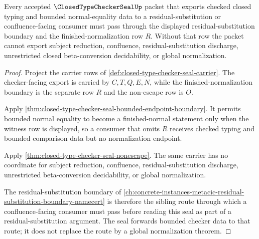 \begin{theorem}
\label{thm:closed-type-checker-seal-residual-substitution-forward-link}
Every accepted $\ClosedTypeCheckerSealUp$ packet that exports checked closed typing and bounded normal-equality data to a residual-substitution or confluence-facing consumer must pass through the displayed residual-substitution boundary and the finished-normalization row $R$. Without that row the packet cannot export subject reduction, confluence, residual-substitution discharge, unrestricted closed beta-conversion decidability, or global normalization.
\end{theorem}
\begin{proof}
Project the carrier rows of \autoref{def:closed-type-checker-seal-carrier}. The checker-facing export is carried by $C,T,Q,E,N$, while the finished-normalization boundary is the separate row $R$ and the non-escape row is $O$.

Apply \autoref{thm:closed-type-checker-seal-bounded-endpoint-boundary}. It permits bounded normal equality to become a finished-normal statement only when the witness row is displayed, so a consumer that omits $R$ receives checked typing and bounded comparison data but no normalization endpoint.

Apply \autoref{thm:closed-type-checker-seal-nonescape}. The same carrier has no coordinate for subject reduction, confluence, residual-substitution discharge, unrestricted beta-conversion decidability, or global normalization.

The residual-substitution boundary of \autoref{ch:concrete-instances-metacic-residual-substitution-boundary-namecert} is therefore the sibling route through which a confluence-facing consumer must pass before reading this seal as part of a residual-substitution argument. The seal forwards bounded checker data to that route; it does not replace the route by a global normalization theorem.
\end{proof}

